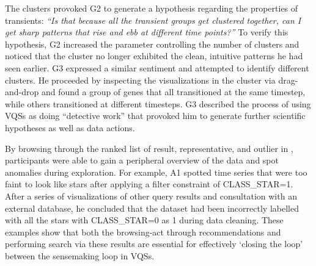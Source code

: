 \par The clusters provoked G2 to generate a hypothesis regarding the properties of transients: \textit{``Is that because all the transient groups get clustered together, can I get sharp patterns that rise and ebb at different time points?''} To verify this hypothesis, G2 increased the parameter controlling the number of clusters and noticed that the cluster no longer exhibited the clean, intuitive patterns he had seen earlier. G3 expressed a similar sentiment and attempted to identify different clusters. He proceeded by inspecting the visualizations in the cluster via drag-and-drop and found a group of genes that all transitioned at the same timestep, while others transitioned at different timesteps. G3 described the process of using VQSs as doing ``detective work'' that provoked him to generate further scientific hypotheses as well as data actions.
\par By browsing through the ranked list of result, representative, and outlier in \zv, participants were able to gain a peripheral overview of the data and spot anomalies during exploration. For example, A1 spotted time series that were too faint to look like stars after applying a filter constraint of CLASS\_STAR=1. After a series of visualizations of other query results and consultation with an external database, he concluded that the dataset had been incorrectly labelled with all the stars with CLASS\_STAR=0 as 1 during data cleaning. These examples show that both the browsing-act through recommendations and performing search via these results are essential for effectively `closing the loop' between the sensemaking loop in VQSs. 
